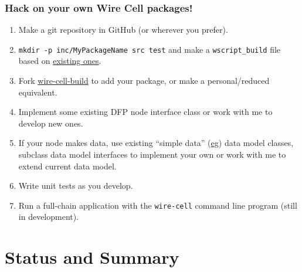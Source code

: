\documentclass[xcolor=dvipsnames]{beamer}
\begin{document}
\begin{frame}
  \frametitle{Hack on your own Wire Cell packages!}

  \begin{enumerate}
  \item Make a git repository in GitHub (or wherever you prefer).
  \item \texttt{mkdir -p inc/MyPackageName src test} and make a
    \texttt{wscript\_build} file based on
    \href{https://github.com/WireCell/wire-cell-alg/blob/master/wscript_build}{existing
      ones}.
  \item Fork
    \href{https://github.com/WireCell/wire-cell-build}{wire-cell-build}
    to add your package, or make a personal/reduced equivalent.
  \item Implement some existing DFP node interface class or work with
    me to develop new ones.
  \item If your node makes data, use existing ``simple data''
    (\href{https://github.com/WireCell/wire-cell-iface/blob/master/inc/WireCellIface/SimpleFrame.h}{eg})
    data model classes, subclass data model interfaces to implement
    your own or work with me to extend current data model.
  \item Write unit tests as you develop.
  \item Run a full-chain application with the \texttt{wire-cell}
    command line program (still in development).
  \end{enumerate}
\end{frame}

\section{Status and Summary}

\begin{frame}
\end{frame}
\end{document}
